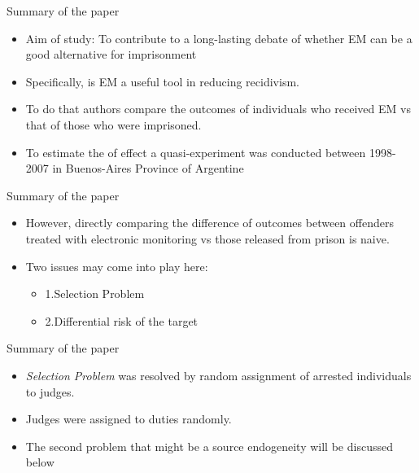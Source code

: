 \documentclass{beamer}
\begin{document}
\begin{frame}{Summary of the paper}
\begin{itemize}
        \item Aim of study: To contribute to a long-lasting debate of whether EM can be a good alternative for imprisonment
        \item Specifically, is EM a useful tool in reducing recidivism. 
        \item To do that authors compare the outcomes of individuals who received EM vs that of those who were imprisoned.
        \item To estimate the of effect a quasi-experiment was conducted between 1998-2007 in Buenos-Aires Province of Argentine
        
                \end{itemize}
\end{frame}
\begin{frame}{Summary of the paper}
\begin{itemize}
        \item However, directly comparing the difference of outcomes between offenders treated with electronic monitoring vs those released from  prison is naive. 
        \item Two issues may come into play here:
        \begin{itemize}
        \item  1.Selection Problem
        \item 2.Differential risk of the target
        \end{itemize}
            \end{itemize}
\end{frame}
\begin{frame} {Summary of the paper}
\begin{itemize}
\item \textit{Selection Problem} was resolved by random assignment of arrested individuals to judges.
\item Judges were assigned to duties randomly.
\item The second problem that might be a source endogeneity will be discussed below
        \end{itemize}
\end{frame}
\end{document}
